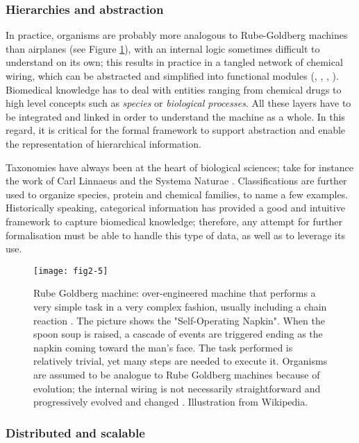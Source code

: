 \subsubsection{Hierarchies and abstraction}
\label{reqhie}

In practice, organisms are probably more analogous to Rube-Goldberg machines than airplanes (see Figure \ref{fig2-5}), with an internal logic sometimes difficult to understand on its own; this results in practice in a tangled network of chemical wiring, which can be abstracted and simplified into functional modules (\cite{hartwell1999molecular}, \cite{ravasz2002hierarchical}, \cite{machado2011modeling}, \cite{fisher2007executable}). Biomedical knowledge has to deal with entities ranging from chemical drugs to high level concepts such as \emph{species} or \emph{biological processes}. All these layers have to be integrated and linked in order to understand the machine as a whole. In this regard, it is critical for the formal framework to support abstraction and enable the representation of hierarchical information.

Taxonomies have always been at the heart of biological sciences; take for instance the work of Carl Linnaeus and the Systema Naturae \citep{von1770systema}. Classifications are further used to organize species, protein and chemical families, to name a few examples. Historically speaking, categorical information has provided a good and intuitive framework to capture biomedical knowledge; therefore, any attempt for further formalisation must be able to handle this type of data, as well as to leverage its use.

\begin{figure}[ht]
    \centering
    \texttt{[image: fig2-5]}
    \caption{Rube Goldberg machine: over-engineered machine that performs a very simple task in a very complex fashion, usually including a chain reaction \citep{rubewiki}. The picture shows the "Self-Operating Napkin". When the spoon soup is raised, a cascade of events are triggered ending as the napkin coming toward the man's face. The task performed is relatively trivial, yet many steps are needed to execute it. Organisms are assumed to be analogue to Rube Goldberg machines because of evolution; the internal wiring is not necessarily straightforward and progressively evolved and changed \citep{ravasz2002hierarchical}. Illustration from Wikipedia.}
    \label{fig2-5}
\end{figure}

\subsubsection{Distributed and scalable}
\label{reqscale}

